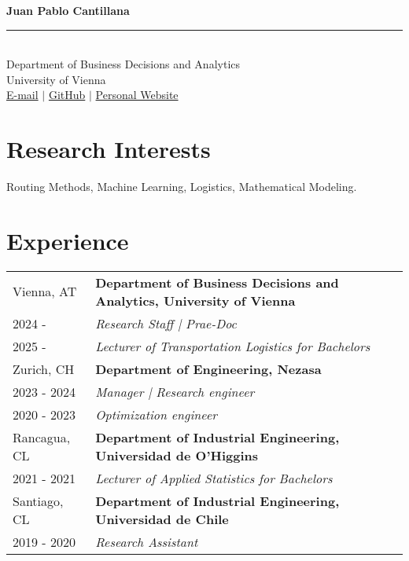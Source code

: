 \documentclass[10pt, a4paper]{article}
\begin{document}
\begin{center}
    {\LARGE \textbf{Juan Pablo Cantillana}} \\[0.2cm]
    \rule{\textwidth}{0.4pt} \\[0.2cm] %
    Department of Business Decisions and Analytics \\
    University of Vienna \\
    \href{mailto:juan.pablo.cantillana.abarca@univie.ac.at}{E-mail} $|$ 
    \href{https://github.com/jpCantillana}{GitHub} $|$
    \href{https://jpCantillana.github.io}{Personal Website}
\end{center}

\section*{Research Interests}
Routing Methods, Machine Learning, Logistics, Mathematical Modeling.

\section*{Experience}

\noindent
\begin{tabular}{@{} p{} p{} @{}}
    Vienna, AT & \textbf{Department of Business Decisions and Analytics, University of Vienna} \\
    2024 -  & \textit{Research Staff | Prae-Doc} \\
    2025 -  & \textit{Lecturer of Transportation Logistics for Bachelors} \\
    Zurich, CH & \textbf{Department of Engineering, Nezasa} \\
    2023 - 2024 & \textit{Manager | Research engineer} \\
    2020 - 2023 & \textit{Optimization engineer} \\
    Rancagua, CL & \textbf{Department of Industrial Engineering, Universidad de O'Higgins} \\
    2021 - 2021 & \textit{Lecturer of Applied Statistics for Bachelors} \\
    Santiago, CL & \textbf{Department of Industrial Engineering, Universidad de Chile} \\
    2019 - 2020 & \textit{Research Assistant} \\
\end{tabular}
\end{document}
